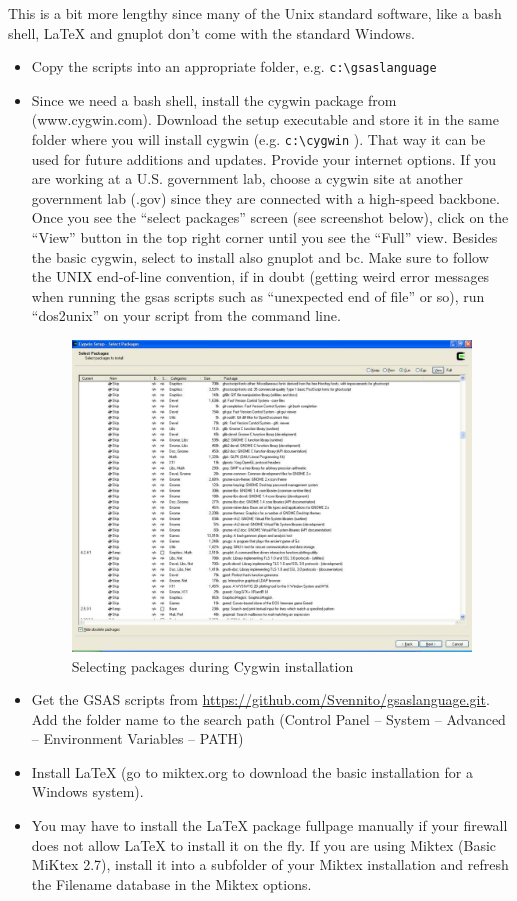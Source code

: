 This is a bit more lengthy since many of the Unix standard software, like a bash shell, \LaTeX{}  and gnuplot don't come with the standard Windows.
\begin{itemize}
\item Copy the scripts into an appropriate folder, e.g. \texttt{c:\textbackslash gsaslanguage} 
\item Since we need a bash shell, install the cygwin package from (www.cygwin.com).  Download the setup executable and store it in the same folder where you will install cygwin (e.g. \texttt{c:\textbackslash cygwin} ). That way it can be used for future additions and updates. Provide your internet options. If you are working at a U.S. government lab, choose a cygwin site at another government lab (.gov) since they are connected with a high-speed backbone. Once you see the ``select packages'' screen (see screenshot below), click on the ``View'' button in the top right corner until you see the ``Full'' view. Besides the basic cygwin, select to install also gnuplot and bc.  Make sure to follow the UNIX end-of-line convention, if in doubt (getting weird error messages when running the gsas scripts such as ``unexpected end of file'' or so), run ``dos2unix'' on your script from the command line.
\begin{figure}[h]
\centering
\includegraphics[width=12cm]{Screenshot1.pdf}
\caption{Selecting packages during Cygwin installation}
\label{fig:Screenshot1}
\end{figure}

\item Get the GSAS scripts from \url{https://github.com/Svennito/gsaslanguage.git}. Add the folder name to the search path (Control Panel -- System -- Advanced
-- Environment Variables -- PATH)
\item Install \LaTeX{}  (go to miktex.org to download the basic installation for a Windows system).
\item You may have to install the \LaTeX{}  package fullpage manually if your firewall does not allow \LaTeX{}  to install it on the fly. If you are using Miktex (Basic MiKtex 2.7), install it into a subfolder of your Miktex installation and refresh the Filename database in the Miktex options.
\end{itemize}

